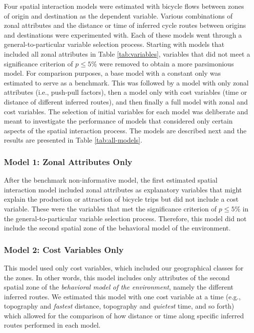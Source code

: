 \documentclass[smallextended]{svjour3}       %
\begin{document}
Four spatial interaction models were estimated with bicycle flows
between zones of origin and destination as the dependent variable.
Various combinations of zonal attributes and the distance or time of
inferred cycle routes between origins and destinations were experimented
with. Each of these models went through a general-to-particular variable
selection process. Starting with models that included all zonal
attributes in Table \ref{tab:variables}, variables that did not meet a
significance criterion of \(p \le 5\)\% were removed to obtain a more
parsimonious model. For comparison purposes, a base model with a
constant only was estimated to serve as a benchmark. This was followed
by a model with only zonal attributes (i.e., push-pull factors), then a
model only with cost variables (time or distance of different inferred
routes), and then finally a full model with zonal and cost variables.
The selection of initial variables for each model was deliberate and
meant to investigate the performance of models that considered only
certain aspects of the spatial interaction process. The models are
described next and the results are presented in Table
\ref{tab:all-models}.

\hypertarget{model-1-zonal-attributes-only}{%
\subsubsection{Model 1: Zonal Attributes
Only}\label{model-1-zonal-attributes-only}}

After the benchmark non-informative model, the first estimated spatial
interaction model included zonal attributes as explanatory variables
that might explain the production or attraction of bicycle trips but did
not include a cost variable. These were the variables that met the
significance criterion of \(p \le 5\)\% in the general-to-particular
variable selection process. Therefore, this model did not include the
second spatial zone of the behavioral model of the environment.

\hypertarget{model-2-cost-variables-only}{%
\subsubsection{Model 2: Cost Variables
Only}\label{model-2-cost-variables-only}}

This model used only cost variables, which included our geographical
classes for the zones. In other words, this model includes only
attributes of the second spatial zone of the \emph{behavioral model of
the environment}, namely the different inferred routes. We estimated
this model with one cost variable at a time (e.g., topography and
\emph{fastest} distance, topography and \emph{quietest} time, and so
forth) which allowed for the comparison of how distance or time along
specific inferred routes performed in each model.
\end{document}
